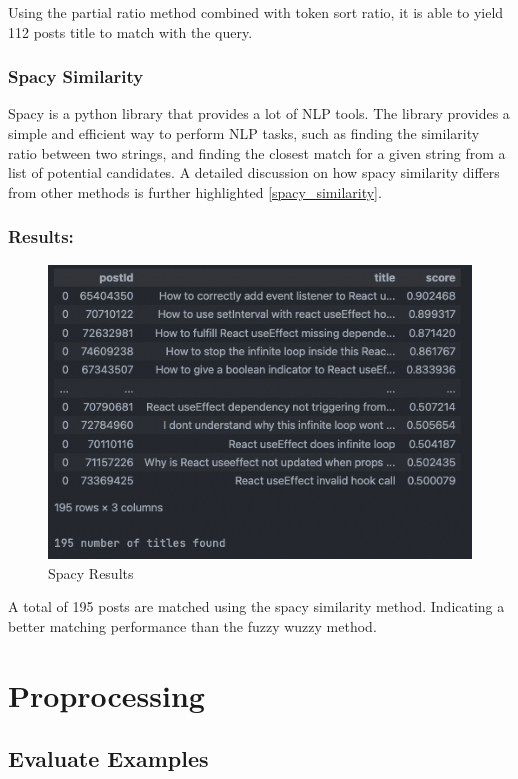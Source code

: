 \noindent Using the partial ratio method combined with token sort ratio, it is able to yield 112 posts title to match with the query.

\subsubsection{Spacy Similarity}
Spacy is a python library that provides a lot of NLP tools. The library provides a simple and efficient way to perform NLP tasks, such as finding the similarity ratio between two strings, and finding the closest match for a given string from a list of potential candidates. A detailed discussion on how spacy similarity differs from other methods is further highlighted \ref{spacy_similarity}.

\subsubsection{Results:} \label{spacy-similarity_results}
\begin{figure}[H]
  \centering
  \includegraphics[scale=0.60]{assets/spacy-query-2-results.png}
  \caption{Spacy Results}
  \label{fig:spacy_similarity}
\end{figure}

\noindent A total of 195 posts are matched using the spacy similarity method. Indicating a better matching performance than the fuzzy wuzzy method.

\section{Proprocessing} \label{preprocessing_results}

\subsection{Evaluate Examples} \label{evaluate-examples}

